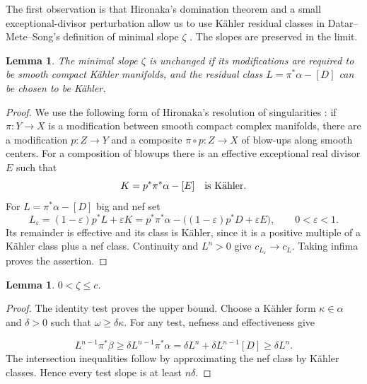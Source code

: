 \documentclass[reqno]{amsart}
\numberwithin{equation}{section}
\newtheorem{lemma}[theorem]{Lemma}
\theoremstyle{definition}
\begin{document}
The first observation is that Hironaka's domination theorem \cite[Corollary~2]{H75} and a
small exceptional-divisor perturbation allow us to use K\"ahler
residual classes in Datar--Mete--Song's definition of minimal slope $\zeta$
\cite[Definition~1.3]{DMS26}. The slopes are preserved in the limit.

\begin{lemma}
    \label{lem:kahler-domination}
The minimal slope $\zeta$ is unchanged if its modifications are required to be smooth compact K\"ahler manifolds, and the residual class $L=\pi^*\alpha-[D]$ can be chosen to be K\"ahler. 
\end{lemma}
\begin{proof}
    We use the following form of Hironaka's resolution of singularities \cite[Corollary 2]{H75}: if $\pi:Y\to X$ is a modification between smooth compact complex manifolds, there are a modification $p:Z\to Y$ and a composite $\pi\circ p:Z\to X$ of blow-ups along smooth centers. For a composition of blowups there is an effective exceptional real divisor $E$ such that
\begin{equation}\label{eq:kahler-infimum}
K=p^*\pi^*\alpha-[E]\quad\hbox{is K\"ahler}.
\end{equation}
For $L=\pi^*\alpha-[D]$ big and nef set
\begin{equation}\label{eq:kahler-perturbation}
L_\varepsilon=(1-\varepsilon)p^*L+\varepsilon K
=p^*\pi^*\alpha-\big((1-\varepsilon)p^*D+\varepsilon E\big),\qquad 0<\varepsilon<1.
\end{equation}
Its remainder is effective and its class is K\"ahler, since it is a positive multiple of a K\"ahler class plus a nef class. Continuity and $L^n>0$ give $c_{L_\varepsilon}\to c_L$. Taking infima proves the assertion.
\end{proof}
\begin{lemma}\label{lem:positive-slope}
$0<\zeta\leq c$.
\end{lemma}
\begin{proof}

The identity test proves the upper bound. Choose a K\"ahler form $\kappa\in\alpha$ and $\delta>0$ such that $\omega\geq\delta\kappa$. For any test, nefness and effectiveness give

\[
L^{n-1}\pi^*\beta
\geq\delta L^{n-1}\pi^*\alpha
=\delta L^n+\delta L^{n-1}[D]
\geq\delta L^n.
\]
The intersection inequalities follow by approximating the nef class by K\"ahler classes. Hence every test slope is at least $n\delta$.

\end{proof}
\end{document}
